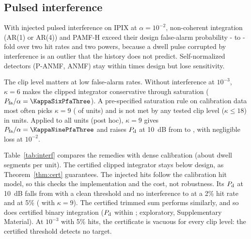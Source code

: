 \documentclass[journal]{IEEEtran}
\begin{document}
\subsection{Pulsed interference}\label{sec:interf}
\begin{table}[!t]
\centering\footnotesize
\caption{Remedies for pulsed interference on IPIX ($\alpha=0.01$, \NUnitsConf{} units). Interference is injected 30~dB above the local power; each pulse is hit with probability $p_{\rm h}$, and bursts are eight pulses long at $p_{\rm h}=5\%$. Entries are the measured $P_{\rm fa}/\alpha$ and the $P_{\rm d}$ of a 10~dB persistent target. Trimmed: \TrimTwo{} ($2\%$) and \TrimFive{} ($5\%$) of eight terms discarded. Bold: $P_{\rm fa}/\alpha>1.2$.}
\label{tab:interf}
\setlength{\tabcolsep}{2.4pt}

\end{table}
With injected pulsed interference on IPIX at $\alpha=10^{-2}$, non-coherent integration (AR(1) or AR(4)) and PAMF-H exceed their design false-alarm probability \IPfaMinAll- to \IPfaMaxInt-fold over two hit rates and two powers, because a dwell pulse corrupted by interference is an outlier that the history does not predict. Self-normalized detectors (P-ANMF, ANMF) stay within \SelfNormIntMax{} times design but lose sensitivity.

The clip level matters at low false-alarm rates. Without interference at $10^{-3}$, $\kappa=6$ makes the clipped integrator conservative through saturation ($P_{\rm fa}/\alpha=\KappaSixPfaThree$). A pre-specified saturation rule on calibration data most often picks $\kappa=9$ ({\KappaNineUnits} of \NUnitsConf{} units) and is not met by any tested clip level ($\kappa\le18$) in \KappaRuleUndefUnits{} units. Applied to all units (post hoc), $\kappa=9$ gives $P_{\rm fa}/\alpha=\KappaNinePfaThree$ and raises $P_{\rm d}$ at 10~dB from \KappaSixPdThree{} to \KappaNinePdThree, with negligible loss at $10^{-2}$.

Table~\ref{tab:interf} compares the remedies with dense calibration (about \DwellSegsPerUnit{} dwell segments per unit). The certified clipped integrator stays below design, as Theorem~\ref{thm:cert} guarantees. The injected hits follow the calibration hit model, so this checks the implementation and the cost, not robustness. Its $P_{\rm d}$ at 10~dB falls from \CleanClipPdTen{} with a clean threshold and no interference to \CertSixPdTwo{} at a 2\% hit rate and \CertSixPdFive{} at 5\% (\CertNinePdFive{} with $\kappa=9$). The certified trimmed sum performs similarly, and so does certified binary integration ($P_{\rm d}$ within \BinCertGapMax; exploratory, Supplementary Material). At $10^{-3}$ with 5\% hits, the certificate is vacuous for every clip level: the certified threshold detects no target.
\end{document}
